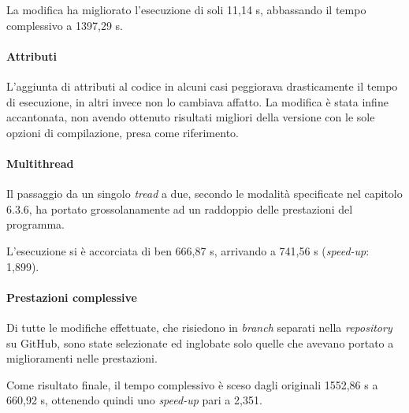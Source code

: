   La modifica ha migliorato l'esecuzione di soli 11,14 s, abbassando il tempo 
  complessivo a 1397,29 s.
  
\paragraph{Attributi \\}
  L'aggiunta di attributi al codice in alcuni casi peggiorava drasticamente il 
  tempo di esecuzione, in altri invece non lo cambiava affatto. La modifica è 
  stata infine accantonata, non avendo ottenuto risultati migliori della 
  versione con le sole opzioni di compilazione, presa come riferimento.
  
\paragraph{Multithread \\}
  Il passaggio da un singolo \emph{tread} a due, secondo le modalità 
  specificate nel capitolo 6.3.6, ha portato grossolanamente ad un raddoppio 
  delle prestazioni del programma.
  
  L'esecuzione si è accorciata di ben 666,87 s, arrivando a 741,56 s 
  (\textit{speed-up}: 1,899).

\paragraph{Prestazioni complessive \\}
  Di tutte le modifiche effettuate, che risiedono in \textit{branch} separati 
  nella \textit{repository} su GitHub, sono state selezionate ed inglobate solo 
  quelle che avevano portato a miglioramenti nelle prestazioni.
  
  Come risultato finale, il tempo complessivo è sceso dagli originali 1552,86 s 
  a 660,92 s, ottenendo quindi uno \textit{speed-up} pari a 2,351.
  

